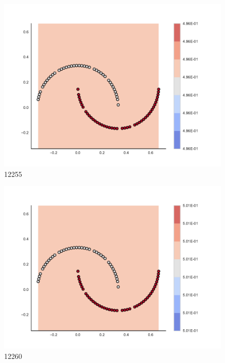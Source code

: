 \begin{subfigure}[b]{0.09\textwidth}
    \includegraphics[clip, trim=2.35cm 1.75cm 4.5cm 0cm,width=\textwidth]{img/convergence/12255.pdf}
    \caption{12255}
    \label{fig:convergence_12255}
\end{subfigure}
%
\begin{subfigure}[b]{0.09\textwidth}
    \includegraphics[clip, trim=2.35cm 1.75cm 4.5cm 0cm,width=\textwidth]{img/convergence/12260.pdf}
    \caption{12260}
    \label{fig:convergence_12260}
\end{subfigure}
%
